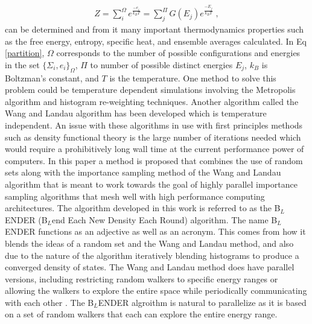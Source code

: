 \documentclass[aps,prl,reprint,superscriptaddress,showkeys]{revtex4-1}
\begin{document}
\begin{equation}
\begin{split}
Z = \sum_{i}^{\Omega}e^{\frac{-e_i}{k_B T} }= \sum_{j}^{\Pi}G(E_j)e^{\frac{-E_j}{k_BT}} \;,
\end{split}
\label{partition}
\end{equation}
can be  determined and from it many important thermodynamics properties such as the free energy, entropy, specific heat, and ensemble averages calculated. In Eq \ref{partition}, $\Omega$ corresponds to the number of possible configurations and energies in the set $\{\Sigma_i,e_i\}_\Omega$, $\Pi$ to number of possible distinct energies $E_j$, $k_B$ is Boltzman's constant, and $T$ is the temperature. One method to solve this problem could be temperature dependent simulations involving the  Metropolis algorithm and histogram re-weighting techniques\cite{metropolis_equation_1953, landau_MC_simulations}.   Another algorithm called the  Wang and Landau algorithm\cite{WL_phys_rev_lett} has been developed which is temperature independent. An issue with these algorithms in use with first principles methods such as density functional theory is the large number of iterations needed which would require a prohibitively long wall time at the current performance power of computers.  In this paper a method is proposed that combines the use of random sets along with the importance sampling method of the Wang and Landau algorithm that is meant to work towards the goal of highly parallel importance sampling algorithms that mesh well with high performance computing architectures. The algorithm developed in this work is referred to as the B$_{L}$ENDER (B$_{L}$end Each New Density Each Round) algorithm. The name B$_{L}$ENDER functions as an  adjective as well as an acronym. This comes from how it blends the ideas of a random set and the Wang and Landau method, and also due to the nature of the algorithm iteratively blending histograms to produce a converged density of states.  The Wang and Landau method does have parallel versions, including  restricting random walkers to specific energy ranges or allowing the walkers to explore the entire space while periodically communicating with each other \cite{MP_Wang_Landau,P_imp_Wang_Landau, Hframe_Wang_Landau}.  The B$_{L}$ENDER algroithm is natural to parallelize as it is based on a set of random walkers that each can explore the entire energy range. 
\end{document}
